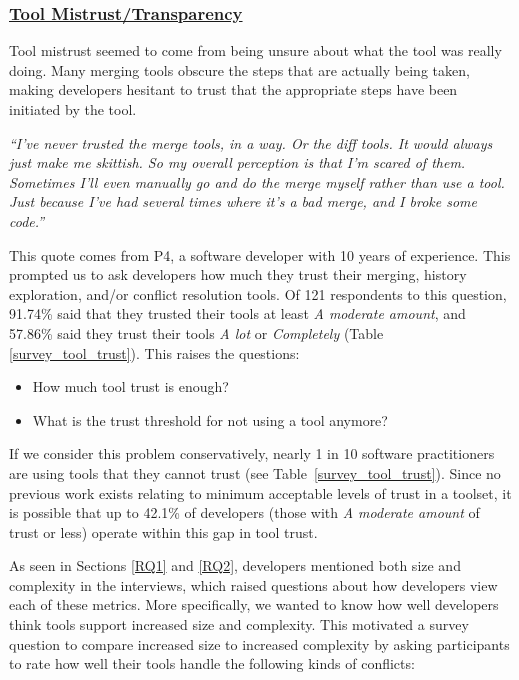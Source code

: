 \subsubsection{\underline{Tool Mistrust/Transparency}}
Tool mistrust seemed to come from being unsure about what the tool was really doing. Many merging tools obscure the steps that are actually being taken, making developers hesitant to trust that the appropriate steps have been initiated by the tool. 
\begin{displayquote}
\textit{``I've never trusted the merge tools, in a way. Or the diff tools. It would always just make me skittish. So my overall perception is that I'm scared of them. Sometimes I'll even manually go and do the merge myself rather than use a tool. Just because I've had several times where it's a bad merge, and I broke some code.''}
\end{displayquote}
This quote comes from P4, a software developer with 10 years of experience.
This prompted us to ask developers how much they trust their merging, history exploration, and/or conflict resolution tools. Of 121 respondents to this question, 91.74\% said that they trusted their tools at least \textit{A moderate amount}, and 57.86\% said they trust their tools \textit{A lot} or \textit{Completely} (Table \ref{survey_tool_trust}). This raises the questions: 
\begin{itemize}
\item How much tool trust is enough? 
\item What is the trust threshold for not using a tool anymore?
\end{itemize}
If we consider this problem conservatively, nearly 1 in 10 software practitioners are using tools that they cannot trust (see Table~\ref{survey_tool_trust}). Since no previous work exists relating to minimum acceptable levels of trust in a toolset, it is possible that up to 42.1\% of developers (those with \textit{A moderate amount} of trust or less) operate within this gap in tool trust.

As seen in Sections \ref{RQ1} and \ref{RQ2}, developers mentioned both size and complexity in the interviews, which raised questions about how developers view each of these metrics. More specifically, we wanted to know how well developers think tools support increased size and complexity.  
This motivated a survey question to compare increased size to increased complexity by asking participants to rate how well their tools handle the following kinds of conflicts:

